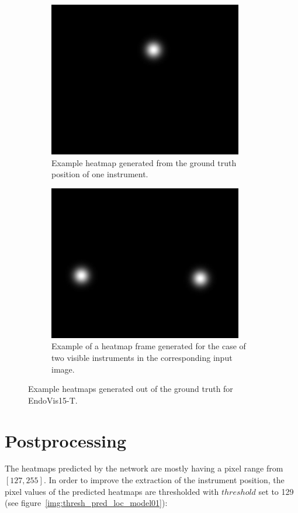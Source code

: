 \begin{figure}
\centering
\begin{subfigure}[t]{0.49\textwidth}
	\centering
	\includegraphics[width=.65\textwidth]{images/dataset/robotic15_segm/heatmap_frame001-1instrument.jpg}
	\caption{Example heatmap generated from the ground truth position of one instrument.}
	\label{img:bla}
\end{subfigure}
\begin{subfigure}[t]{0.49\textwidth}
	\centering
	\includegraphics[width=.65\textwidth]{images/dataset/robotic15_segm/heatmap_frame001_2instruments.jpg}
	\caption{Example of a heatmap frame generated for the case of two visible instruments in the corresponding input image.}
	\label{img:heatmap_only_2instr}
\end{subfigure}
\caption[Example heatmap frames]{Example heatmaps generated out of the ground truth for EndoVis15-T.}
\label{img:two_heatmap_frames}
\end{figure}


\section{Postprocessing}
The heatmaps predicted by the network are mostly having a pixel range from $[127,255]$.
In order to improve the extraction of the instrument position, the pixel values of the predicted heatmaps are thresholded with $threshold$ set to 129 (see figure~\ref{img:thresh_pred_loc_model01}): 

